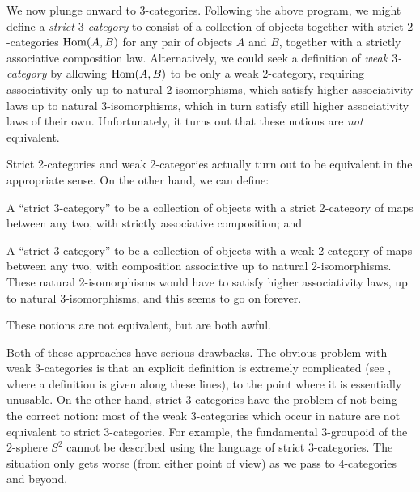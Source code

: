 \begin{1.1.1 Goals and Obstacles}
We now plunge onward to $3$-categories. Following the above
program, we might define a {\it strict $3$-category} to consist of a
collection of objects together with strict $2$-categories
$\operatorname{Hom}(A,B)$ for any pair of objects $A$ and $B$, together with a
strictly associative composition law. Alternatively, we could seek
a definition of {\it weak $3$-category} by allowing $\operatorname{Hom}(A,B)$ to
be only a weak $2$-category, requiring associativity only up to
natural $2$-isomorphisms, which satisfy higher associativity laws
up to natural $3$-isomorphisms, which in turn satisfy still higher
associativity laws of their own. Unfortunately, it turns out that
these notions are {\em not} equivalent.
\begin{shaded}
Strict 2-categories and weak 2-categories actually turn out to be equivalent in the appropriate sense. On the other hand, we can define:
\begin{itemise}
\item A ``strict 3-category'' to be a collection of objects with a strict 2-category of maps between any two, with strictly associative composition; and
\item A ``strict 3-category'' to be a collection of objects with a weak 2-category of maps between any two, with composition associative up to natural 2-isomorphisms. These natural 2-isomorphisms would have to satisfy higher associativity laws, up to natural 3-isomorphisms, and this seems to go on forever.
\end{itemise}
These notions are not equivalent, but are both awful.
\end{shaded}


Both of these approaches have serious drawbacks. The obvious
problem with weak $3$-categories is that an explicit definition is
extremely complicated (see \cite{tricat}, where a definition is given along these lines), to the point where it is
essentially unusable. On the other hand, strict $3$-categories
have the problem of not being the correct notion: most of the weak
$3$-categories which occur in nature are not equivalent to
strict $3$-categories. For example, the fundamental $3$-groupoid of
the $2$-sphere $S^2$ cannot be described using the language of
strict $3$-categories. The situation only gets worse (from either
point of view) as we pass to $4$-categories and beyond.


\end{1.1.1 Goals and Obstacles}
